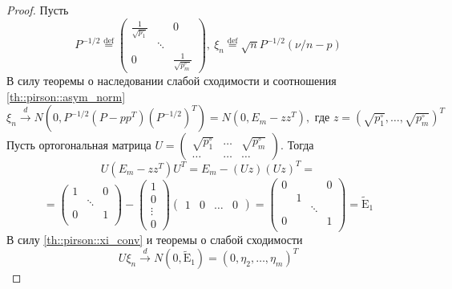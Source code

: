 \documentclass[12pt]{article}
\theoremstyle{basic_theorem}
\theoremstyle{name_theorem}
\newcommand*{\defeq}{\stackrel{\text{def}}{=}}
\def\E{ \mathrm{E} }
\begin{document}
\begin{proof}
        Пусть
        \[P^{-1/2}\defeq\begin{pmatrix}
            \frac{1}{\sqrt{p_1^\circ}} & & 0 \\
              & \ddots & \\
            0 & & \frac{1}{\sqrt{p_m^\circ}}
        \end{pmatrix},\
        \xi_n\defeq\sqrt{n}P^{-1/2}(\nu/n-p)
        \]
        В силу теоремы о наследовании слабой сходимости и соотношения \eqref{th::pirson::asym_norm}
        \begin{equation} \label{th::pirson::xi_conv}
            \xi_n\xrightarrow{d}N(0, P^{-1/2}(P-pp^T)(P^{-1/2})^T)=N(0, E_m-zz^T),\text{ где } z=(\sqrt{p_1^\circ},\ldots,\sqrt{p_m^\circ})^T
        \end{equation}
        Пусть ортогональная матрица $U=\begin{pmatrix}
            \sqrt{p_1^\circ} & \ldots & \sqrt{p_m^\circ} \\
            \ldots & \ldots & \ldots
        \end{pmatrix}$. Тогда
        \[U(E_m-zz^T)U^T=E_m-(Uz)(Uz)^T=\]
        \[=\begin{pmatrix}
            1 &        & 0 \\
              & \ddots &   \\
            0 &        & 1 \\
        \end{pmatrix}-\begin{pmatrix}
            1 \\ 0 \\ \vdots \\ 0
        \end{pmatrix}\begin{pmatrix}
            1  & 0  & \ldots  & 0
        \end{pmatrix}=\begin{pmatrix}
            0 &   &        & 0 \\
              & 1 &        &   \\
              &   & \ddots &   \\
            0 &   &        & 1 \\
        \end{pmatrix}=\widetilde{\E}_1\]
        В силу \eqref{th::pirson::xi_conv} и теоремы о слабой сходимости
        \begin{equation} \label{th::pirson::uxi_conv}
            U\xi_n\xrightarrow{d}N(0,\widetilde{\E}_1) = (0,\eta_2,\ldots,\eta_m)^T

\end{equation}
\end{proof}
\end{document}
